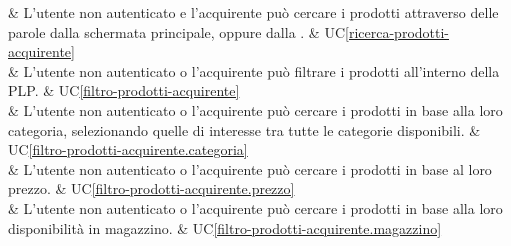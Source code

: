  & L'utente non autenticato e l'acquirente può cercare i prodotti attraverso delle parole dalla schermata principale, oppure dalla . & UC\ref{ricerca-prodotti-acquirente} \\

 & L'utente non autenticato o l'acquirente può filtrare i prodotti all'interno della PLP. & UC\ref{filtro-prodotti-acquirente} \\

 & L'utente non autenticato o l'acquirente può cercare i prodotti in base alla loro categoria, selezionando quelle di interesse tra tutte le categorie disponibili. & UC\ref{filtro-prodotti-acquirente.categoria} \\

 & L'utente non autenticato o l'acquirente può cercare i prodotti in base al loro prezzo. & UC\ref{filtro-prodotti-acquirente.prezzo} \\

 & L'utente non autenticato o l'acquirente può cercare i prodotti in base alla loro disponibilità in magazzino. & UC\ref{filtro-prodotti-acquirente.magazzino} \\
